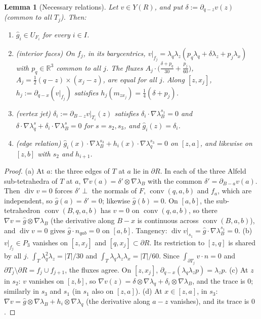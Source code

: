 \documentclass[11pt]{article}
\newtheorem{lemma}[theorem]{Lemma}
\theoremstyle{definition}
\newcommand{\R}{\mathbb R}
\newcommand{\gh}{\hat g}
\renewcommand{\div}{\operatorname{div}}
\DeclareMathOperator{\conv}{conv}
\begin{document}
\begin{lemma}[Necessary relations]\label{l:nec}
Let $v\in Y(R)$, and put $\delta:=\partial_{q-z}v(z)$ (common to all $T_j$). Then:
\begin{enumerate}[label=(\alph*)]
\item $\gh_i\in U_{F_i}$ for every $i\in I$.
\item \emph{(interior faces)} On $f_j$, in its barycentrics, $v|_{f_j}=\lambda_q\lambda_z(p_q\lambda_q+\delta\lambda_z+p_j\lambda_{x})$ with $p_q\in\R^3$ common to all $j$. The fluxes $A_j\cdot\bigl(\frac{\delta+p_q}{30}+\frac{p_j}{60}\bigr)$, $A_j=\frac12(q-z)\times(x_j-z)$, are equal for all $j$. Along $[z,x_j]$, $h_j:=\partial_{q-x}(v|_{f_j})$ satisfies $h_j(m_{zx_j})=\frac14(\delta+p_j)$.
\item \emph{(vertex jet)} $\delta_i:=\partial_{B-z}v|_{T_i}(z)$ satisfies $\delta_i\cdot\nabla\lambda^{s_1}_B=0$ and $\delta\cdot\nabla\lambda_q^{s}+\delta_i\cdot\nabla\lambda_B^{s}=0$ for $s=s_2,s_3$, and $\gh_i(z)=\delta_i$.
\item \emph{(edge relation)} $\gh_i(x)\cdot\nabla\lambda_B^{s_3}+h_i(x)\cdot\nabla\lambda_q^{s_3}=0$ on $[z,a]$, and likewise on $[z,b]$ with $s_2$ and $h_{i+1}$.
\end{enumerate}
\end{lemma}
\begin{proof}
(a) At $a$: the three edges of $T$ at $a$ lie in $\partial R$. In each of the three Alfeld sub-tetrahedra of $T$ at $a$, $\nabla v(a)=\delta'\otimes\nabla\lambda_B$ with the common $\delta'=\partial_{B-a}v(a)$. Then $\div v=0$ forces $\delta'\perp$ the normals of $F$, $\conv(q,a,b)$ and $f_a$, which are independent, so $\gh(a)=\delta'=0$; likewise $\gh(b)=0$. On $[a,b]$, the sub-tetrahedron $\conv(B,q,a,b)$ has $v=0$ on $\conv(q,a,b)$, so there $\nabla v=\gh\otimes\nabla\lambda_B$ (the derivative along $B-x$ is continuous across $\conv(B,a,b)$), and $\div v=0$ gives $\gh\cdot n_{qab}=0$ on $[a,b]$. Tangency: $\div v|_{s_1}=\gh\cdot\nabla\lambda_B^{s_1}=0$.
(b) $v|_{f_j}\in P_3$ vanishes on $[z,x_j]$ and $[q,x_j]\subset\partial R$. Its restriction to $[z,q]$ is shared by all $j$. $\int_T\lambda_q^2\lambda_z=|T|/30$ and $\int_T\lambda_q\lambda_z\lambda_x=|T|/60$. Since $\int_{\partial T_j}v\cdot n=0$ and $\partial T_j\setminus\partial R=f_j\cup f_{j+1}$, the fluxes agree. On $[z,x_j]$, $\partial_{q-x}(\lambda_q\lambda_z p)=\lambda_zp$.
(c) At $z$ in $s_2$: $v$ vanishes on $[z,b]$, so $\nabla v(z)=\delta\otimes\nabla\lambda_q+\delta_i\otimes\nabla\lambda_B$, and the trace is $0$; similarly in $s_3$ and $s_1$ (in $s_1$ also on $[z,a]$).
(d) At $x\in[z,a]$, in $s_3$: $\nabla v=\gh\otimes\nabla\lambda_B+h_i\otimes\nabla\lambda_q$ (the derivative along $a-z$ vanishes), and its trace is $0$.
\end{proof}
\end{document}
